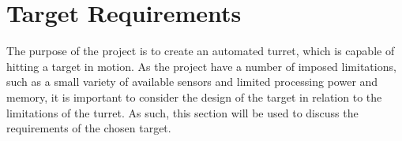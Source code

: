 \section{Target Requirements}\label{TargetReq}
The purpose of the project is to create an automated turret, which is capable of
hitting a target in motion. As the project have a number of imposed limitations,
such as a small variety of available sensors and limited processing power and
memory, it is important to consider the design of the target in relation to the
limitations of the turret. As such, this section will be used to discuss the
requirements of the chosen target.
